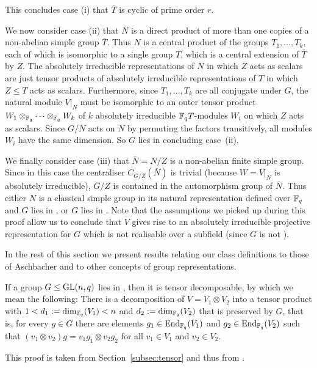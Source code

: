 This concludes case (i) that $\bar T$ is cyclic of prime order $r$.

We now consider case (ii) that $\bar N$ is a direct product of more than
one copies of a non-abelian simple group $\bar T$. Thus $N$ is a
central product of the groups $T_1, \ldots, T_k$, each of which is
isomorphic to a single group $T$, which is a central extension of
$\bar T$ by $Z$. The absolutely irreducible representations
of $N$ in which $Z$ acts as scalars are just tensor products of 
absolutely irreducible representations of $T$ in which $Z \le T$ acts as
scalars. Furthermore, since $T_1, \ldots, T_k$ are all conjugate under
$G$, the natural module $V|_N$ must be isomorphic to an outer tensor product
$W_1 \otimes_{\mathbb{F}_q} \cdots \otimes_{\mathbb{F}_q} W_k$ 
of $k$ absolutely irreducible $\mathbb{F}_q T$-modules $W_i$ on which $Z$
acts as scalars. Since $G/N$ acts on $N$ by permuting the factors
transitively, all modules $W_i$ have the same dimension. So $G$ lies in
 concluding case~(ii).

We finally consider case (iii) that $\bar N = N/Z$ is a non-abelian finite 
simple group. Since in this case the centraliser $C_{G/Z}(\bar N)$ is 
trivial (because $W=V|_N$ is absolutely irreducible), 
$G/Z$ is contained in the automorphism group of $\bar N$. 
Thus either $N$ is a classical simple group in its natural
representation defined over $\mathbb{F}_q$ and
$G$ lies in , or $G$ lies in . Note that the assumptions we
picked up during this proof allow us to conclude that $V$
gives rise to an absolutely irreducible projective representation for
$G$ which is not realisable over a subfield (since $G$ is not ).
\proofend

\medskip
In the rest of this section we present results relating our class
definitions to those of Aschbacher and to other concepts of group
representations.

\begin{Prop}
    \label{tensorprop}
%
If a group $G \le \GL(n,q)$ lies in , then it is tensor decomposable,
by which we mean the following:
There is a decomposition
of\/ $V = V_1 \otimes V_2$ into a tensor product with 
$1 < d_1 := \dim_{\mathbb{F}_q}(V_1) < n$
and $d_2 := \dim_{\mathbb{F}_q}(V_2)$ that is preserved by $G$, 
that is, for every $g \in
G$ there are elements $g_1 \in \End_{\F_q}(V_1)$ and $g_2 \in
\End_{\F_q}(V_2)$ such that $(v_1 \otimes v_2) g = v_1 g_1 \otimes v_2 g_2$
for all $v_1 \in V_1$ and $v_2 \in V_2$.
\end{Prop}
\proofbeg
This proof is taken from Section~\ref{subsec:tensor} and thus from 
\cite[Section~6.6]{subfieldpaper}.

